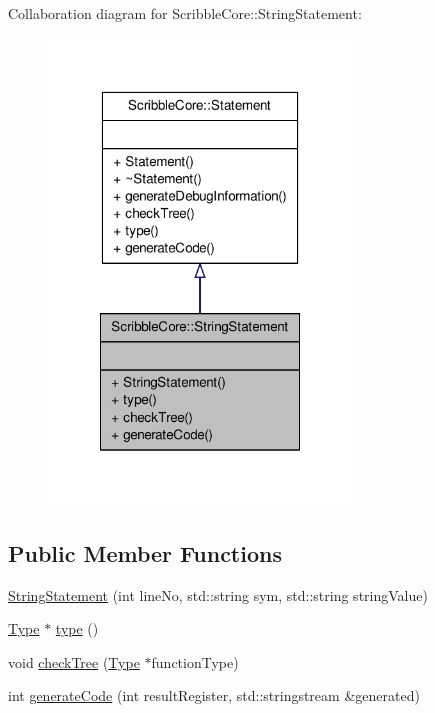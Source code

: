 Collaboration diagram for Scribble\-Core\-:\-:String\-Statement\-:
\nopagebreak
\begin{figure}[H]
\begin{center}
\leavevmode
\includegraphics[width=228pt]{class_scribble_core_1_1_string_statement__coll__graph}
\end{center}
\end{figure}
\subsection*{Public Member Functions}
\begin{DoxyCompactItemize}
\item 
\hyperlink{class_scribble_core_1_1_string_statement_ae88457a1b4095682196ebc13da71cf0e}{String\-Statement} (int line\-No, std\-::string sym, std\-::string string\-Value)
\item 
\hyperlink{class_scribble_core_1_1_type}{Type} $\ast$ \hyperlink{class_scribble_core_1_1_string_statement_ac7c9a403ea405c1d248079bdb59a4b4b}{type} ()
\item 
void \hyperlink{class_scribble_core_1_1_string_statement_a4740fbc28660e425aba8d9ad1ed9739d}{check\-Tree} (\hyperlink{class_scribble_core_1_1_type}{Type} $\ast$function\-Type)
\item 
int \hyperlink{class_scribble_core_1_1_string_statement_a9483a61bc8cc850eee665e1194a778ba}{generate\-Code} (int result\-Register, std\-::stringstream \&generated)
\end{DoxyCompactItemize}


